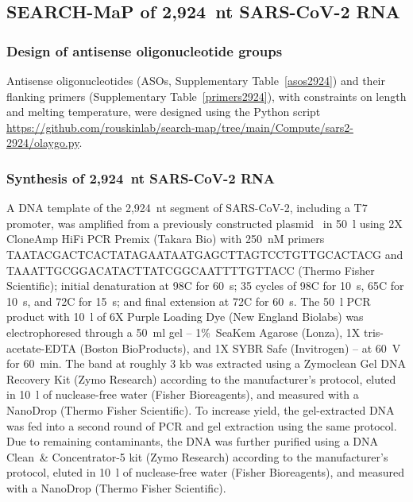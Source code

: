 \documentclass[main.tex]{subfiles}
\begin{document}
\subsection{SEARCH-MaP of 2,924~nt SARS-CoV-2 RNA}

\subsubsection{Design of antisense oligonucleotide groups}

Antisense oligonucleotides (ASOs, Supplementary Table~\ref{asos2924}) and their flanking primers (Supplementary Table~\ref{primers2924}), with constraints on length and melting temperature, were designed using the Python script \url{https://github.com/rouskinlab/search-map/tree/main/Compute/sars2-2924/olaygo.py}.

\subsubsection{Synthesis of 2,924~nt SARS-CoV-2 RNA}

A DNA template of the 2,924~nt segment of SARS-CoV-2, including a T7 promoter, was amplified from a previously constructed plasmid~\cite{Lan2022} in 50~\textmu l using 2X CloneAmp HiFi PCR Premix (Takara Bio) with 250~nM primers TAATACGACTCACTATAGAATAATGAGCTTAGTCCTGTTGCACTACG and TAAATTGCGGACATACTTATCGGCAATTTTGTTACC (Thermo Fisher Scientific); initial denaturation at 98\textdegree C for 60~s; 35 cycles of 98\textdegree C for 10~s, 65\textdegree C for 10~s, and 72\textdegree C for 15~s; and final extension at 72\textdegree C for 60~s.
The 50~\textmu l PCR product with 10~\textmu l of 6X Purple Loading Dye (New England Biolabs) was electrophoresed through a 50~ml gel -- 1\%~SeaKem Agarose (Lonza), 1X tris-acetate-EDTA (Boston BioProducts), and 1X SYBR Safe (Invitrogen) -- at 60~V for 60~min.
The band at roughly 3 kb was extracted using a Zymoclean Gel DNA Recovery Kit (Zymo Research) according to the manufacturer's protocol, eluted in 10~\textmu l of nuclease-free water (Fisher Bioreagents), and measured with a NanoDrop (Thermo Fisher Scientific).
To increase yield, the gel-extracted DNA was fed into a second round of PCR and gel extraction using the same protocol.
Due to remaining contaminants, the DNA was further purified using a DNA Clean~\& Concentrator-5 kit (Zymo Research) according to the manufacturer's protocol, eluted in 10~\textmu l of nuclease-free water (Fisher Bioreagents), and measured with a NanoDrop (Thermo Fisher Scientific).
\end{document}

